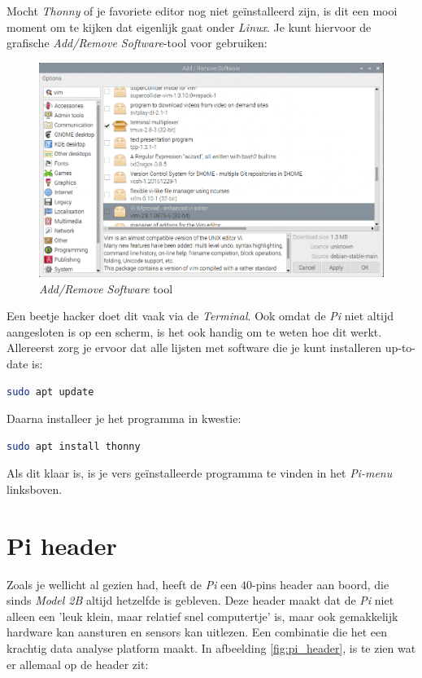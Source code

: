Mocht \textit{Thonny} of je favoriete editor nog niet geïnstalleerd zijn, is dit een mooi moment om te kijken dat eigenlijk gaat onder \textit{Linux}. Je kunt hiervoor de grafische \textit{Add/Remove Software}-tool voor gebruiken:
\begin{figure}[h!]
\centering\includegraphics[scale=0.25]{Pictures/chapter05/add_remove_software.png}
\caption{\textit{Add/Remove Software} tool}
\label{fig:addremovesoftware} %
\end{figure}

\begin{remark}
Een beetje hacker doet dit vaak via de \textit{Terminal}. Ook omdat de \textit{Pi} niet altijd aangesloten is op een scherm, is het ook handig om te weten hoe dit werkt. Allereerst zorg je ervoor dat alle lijsten met software die je kunt installeren up-to-date is:
\begin{lstlisting}[language=bash]
sudo apt update
\end{lstlisting}

Daarna installeer je het programma in kwestie:
\begin{lstlisting}[language=bash]
sudo apt install thonny
\end{lstlisting}
Als dit klaar is, is je vers geïnstalleerde programma te vinden in het \textit{Pi-menu} linksboven.
\end{remark}

\newpage 

\section{Pi header}
Zoals je wellicht al gezien had, heeft de \textit{Pi} een $40$-pins header aan boord, die sinds \textit{Model 2B} altijd hetzelfde is gebleven. Deze header maakt dat de \textit{Pi} niet alleen een 'leuk klein, maar relatief snel computertje' is, maar ook gemakkelijk hardware kan aansturen en sensors kan uitlezen. Een combinatie die het een krachtig data analyse platform maakt. In afbeelding \ref{fig:pi_header}, is te zien wat er allemaal op de header zit: 


